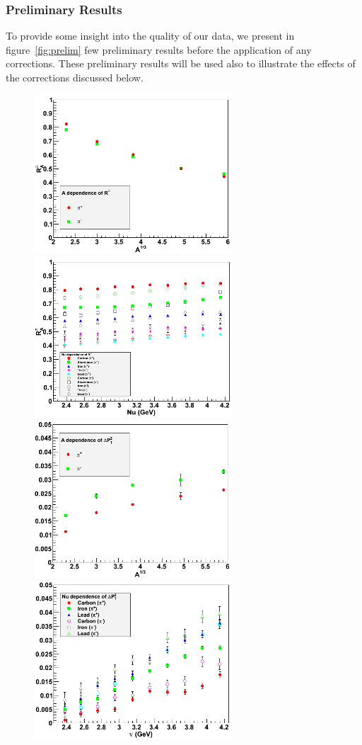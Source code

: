 \subsubsection{Preliminary Results}
\label{prelim}

To provide some insight into the quality of our data, we present in figure~\ref{fig:prelim} few preliminary results before the application of any corrections. These preliminary results will be used also to illustrate the effects of the corrections discussed below.

\begin{figure}[htb]
\centering
\includegraphics[width=7.4cm] {chap5-fig/a_RvA.png} 
\includegraphics[width=7.4cm] {chap5-fig/a_RvZ.png} 
\includegraphics[width=7.4cm] {chap5-fig/a_PvA.png} 
\includegraphics[width=7.4cm] {chap5-fig/a_PvNu.png} 

\end{figure}
